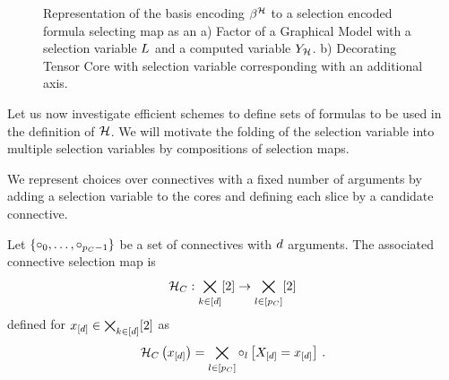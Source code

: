 \begin{figure}[h]
    \begin{center}
        
    \end{center}
    \caption{Representation of the basis encoding $\beta^{\mathcal{H}}$ to a selection encoded formula selecting map as an
    a) Factor of a Graphical Model with a selection variable $L$ and a computed variable $Y_{\mathcal{H}}$.
    b) Decorating Tensor Core with selection variable corresponding with an additional axis.}
    \label{fig:formulaSelectionMap}
\end{figure}



Let us now investigate efficient schemes to define sets of formulas to be used in the definition of $\mathcal{H}$.
We will motivate the folding of the selection variable into multiple selection variables by compositions of selection maps.



We represent choices over connectives with a fixed number of arguments by adding a selection variable to the cores and defining each slice by a candidate connective.

\begin{definition}
    \label{def:connectiveSelector}
    Let $\{\circ_{0},\ldots,\circ_{p_{C}-1}\}$ be a set of connectives with $d$ arguments.
    The associated connective selection map is
    \begin{align*}
        \mathcal{H}_{C} : \bigtimes_{k\in[d]}[2] \rightarrow \bigtimes_{l\in[p_{C}]}[2]
    \end{align*}
    defined for $x_{[d]}\in\bigtimes_{k\in[d]}[2]$ as
    \begin{align*}
        \mathcal{H}_{C}\left(x_{[d]}\right) = \bigtimes_{l\in[p_{C}]} \circ_{l}\left[X_{[d]}=x_{[d]}\right] \, .
    \end{align*}
\end{definition}

